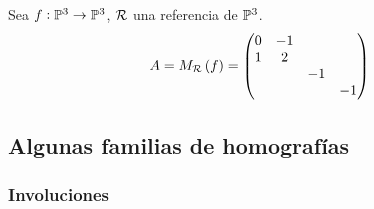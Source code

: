 \begin{example}
    Sea $f : \mathbb{P}^3 \to \mathbb{P}^3$, $\mathcal{R}$ una referencia de $\mathbb{P}^3$.
    \[
        A = M_{\mathcal{R}}\left( f\right) = \begin{pmatrix}
            0 & -1 & & \\
            1 & 2 & & \\
            & & -1 & \\
            & & & -1
        \end{pmatrix}
    \]
\end{example}

\subsection{Algunas familias de homografías}

\subsubsection{Involuciones}

